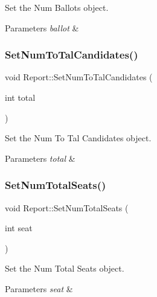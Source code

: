 Set the Num Ballots object. 


\begin{DoxyParams}{Parameters}
{\em ballot} & \\
\hline
\end{DoxyParams}
\mbox{\label{classReport_a5e2b915fae64358202460250b73dbb46}} 
\subsubsection{\texorpdfstring{Set\+Num\+To\+Tal\+Candidates()}{SetNumToTalCandidates()}}
{\footnotesize\ttfamily void Report\+::\+Set\+Num\+To\+Tal\+Candidates (\begin{DoxyParamCaption}\item[{int}]{total }\end{DoxyParamCaption})\hspace{0.3cm}{\ttfamily [inline]}}



Set the Num To Tal Candidates object. 


\begin{DoxyParams}{Parameters}
{\em total} & \\
\hline
\end{DoxyParams}
\mbox{\label{classReport_a395c9d4a03d8ac9d6476e8bac95e829a}} 
\subsubsection{\texorpdfstring{Set\+Num\+Total\+Seats()}{SetNumTotalSeats()}}
{\footnotesize\ttfamily void Report\+::\+Set\+Num\+Total\+Seats (\begin{DoxyParamCaption}\item[{int}]{seat }\end{DoxyParamCaption})\hspace{0.3cm}{\ttfamily [inline]}}



Set the Num Total Seats object. 


\begin{DoxyParams}{Parameters}
{\em seat} & \\
\hline
\end{DoxyParams}
\mbox{\label{classReport_ade621e193bc103820ca18830295934a9}} 
